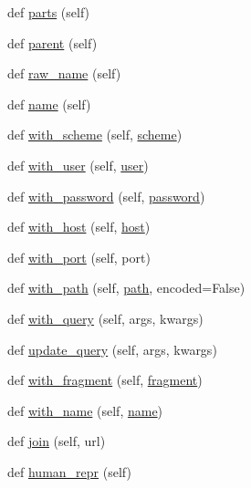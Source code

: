 \begin{DoxyCompactItemize}
\item 
def \hyperlink{classyarl_1_1_u_r_l_a5c6a75641c71c3a4bf0b55c678ac65ef}{parts} (self)
\item 
def \hyperlink{classyarl_1_1_u_r_l_a76a6b04d97a5ccab56a2b5a1d25bc0e7}{parent} (self)
\item 
def \hyperlink{classyarl_1_1_u_r_l_ad42c3ff9c5d78c63bf0701e7a59e3666}{raw\+\_\+name} (self)
\item 
def \hyperlink{classyarl_1_1_u_r_l_acb5d19be34f6fec67c92471c3f098f1a}{name} (self)
\item 
def \hyperlink{classyarl_1_1_u_r_l_a2af372c47bdd3df6ef0a01d6d996e4d4}{with\+\_\+scheme} (self, \hyperlink{classyarl_1_1_u_r_l_a8b60f8bedeae832f0a6b829d51f67d72}{scheme})
\item 
def \hyperlink{classyarl_1_1_u_r_l_a8d76855aa317e45d41073eff8f992394}{with\+\_\+user} (self, \hyperlink{classyarl_1_1_u_r_l_ab04fc87f41bbf84de1c3af564afa6e2f}{user})
\item 
def \hyperlink{classyarl_1_1_u_r_l_abc2345cbea010188a08667baca670767}{with\+\_\+password} (self, \hyperlink{classyarl_1_1_u_r_l_a634441286d0daca5528ba5f48373ac21}{password})
\item 
def \hyperlink{classyarl_1_1_u_r_l_ac827581365dd844bef809bbd939c84d2}{with\+\_\+host} (self, \hyperlink{classyarl_1_1_u_r_l_ae650199d67e0c5092c25b22c14caed54}{host})
\item 
def \hyperlink{classyarl_1_1_u_r_l_a88cd2011f1e911ae5d03a7d9e6cd32f5}{with\+\_\+port} (self, port)
\item 
def \hyperlink{classyarl_1_1_u_r_l_a290cebea7739ab44f0d4517e22fe8140}{with\+\_\+path} (self, \hyperlink{classyarl_1_1_u_r_l_ad0f8dd2dcbe14c8e29084f73148b584e}{path}, encoded=False)
\item 
def \hyperlink{classyarl_1_1_u_r_l_af83468597cc7a9ba6bfc9ec3da6fe262}{with\+\_\+query} (self, args, kwargs)
\item 
def \hyperlink{classyarl_1_1_u_r_l_a6d444b93736628dcb4c168b0a2f673d9}{update\+\_\+query} (self, args, kwargs)
\item 
def \hyperlink{classyarl_1_1_u_r_l_a846e1ebcc72be24c20889429d6865f15}{with\+\_\+fragment} (self, \hyperlink{classyarl_1_1_u_r_l_a50c3724e1a627325be8f496cda2f613b}{fragment})
\item 
def \hyperlink{classyarl_1_1_u_r_l_ae2bac85701de37b1554094aecd4e5040}{with\+\_\+name} (self, \hyperlink{classyarl_1_1_u_r_l_acb5d19be34f6fec67c92471c3f098f1a}{name})
\item 
def \hyperlink{classyarl_1_1_u_r_l_a6a8621c960edb357557a46b772225928}{join} (self, url)
\item 
def \hyperlink{classyarl_1_1_u_r_l_ab633c320e7030c9b6461241151ad3a7a}{human\+\_\+repr} (self)
\end{DoxyCompactItemize}

